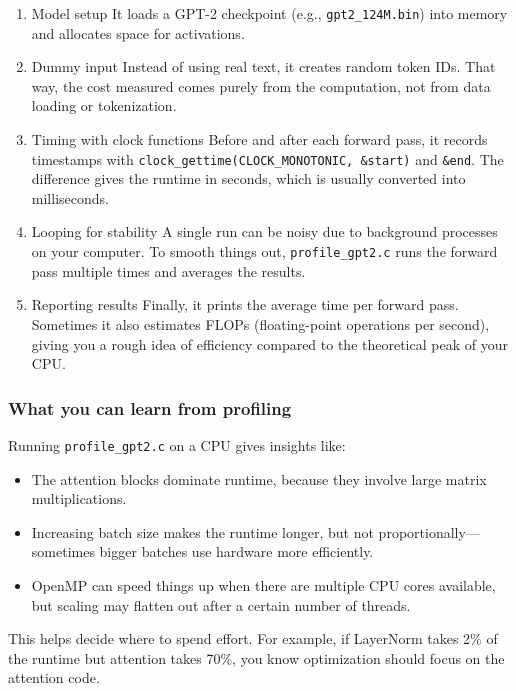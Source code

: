 \documentclass[
  letterpaper,
  DIV=11,
  numbers=noendperiod]{scrreprt}
\providecommand{\tightlist}{%
  \setlength{\itemsep}{0pt}\setlength{\parskip}{0pt}}
\begin{document}
\begin{enumerate}
\def\labelenumi{\arabic{enumi}.}
\item
  Model setup It loads a GPT-2 checkpoint (e.g.,
  \texttt{gpt2\_124M.bin}) into memory and allocates space for
  activations.
\item
  Dummy input Instead of using real text, it creates random token IDs.
  That way, the cost measured comes purely from the computation, not
  from data loading or tokenization.
\item
  Timing with clock functions Before and after each forward pass, it
  records timestamps with
  \texttt{clock\_gettime(CLOCK\_MONOTONIC,\ \&start)} and
  \texttt{\&end}. The difference gives the runtime in seconds, which is
  usually converted into milliseconds.
\item
  Looping for stability A single run can be noisy due to background
  processes on your computer. To smooth things out,
  \texttt{profile\_gpt2.c} runs the forward pass multiple times and
  averages the results.
\item
  Reporting results Finally, it prints the average time per forward
  pass. Sometimes it also estimates FLOPs (floating-point operations per
  second), giving you a rough idea of efficiency compared to the
  theoretical peak of your CPU.
\end{enumerate}

\subsubsection{What you can learn from
profiling}\label{what-you-can-learn-from-profiling}

Running \texttt{profile\_gpt2.c} on a CPU gives insights like:

\begin{itemize}
\tightlist
\item
  The attention blocks dominate runtime, because they involve large
  matrix multiplications.
\item
  Increasing batch size makes the runtime longer, but not
  proportionally---sometimes bigger batches use hardware more
  efficiently.
\item
  OpenMP can speed things up when there are multiple CPU cores
  available, but scaling may flatten out after a certain number of
  threads.
\end{itemize}

This helps decide where to spend effort. For example, if LayerNorm takes
2\% of the runtime but attention takes 70\%, you know optimization
should focus on the attention code.
\end{document}
